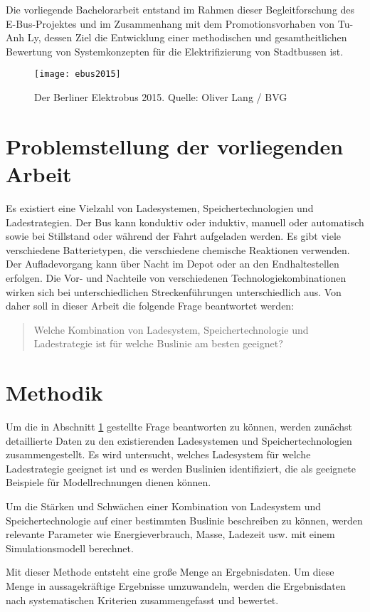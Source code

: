 Die vorliegende Bachelorarbeit entstand im Rahmen dieser Begleitforschung des E-Bus-Projektes und im Zusammenhang mit dem Promotionsvorhaben von Tu-Anh Ly, dessen Ziel die Entwicklung einer methodischen und gesamtheitlichen Bewertung von Systemkonzepten für die Elektrifizierung von Stadtbussen ist.   

\begin{figure}\centering
	\texttt{[image: ebus2015]}
	\caption[Der Berliner Elektrobus 2015]{Der Berliner Elektrobus 2015. Quelle: Oliver Lang / BVG}
	\label{abb_ebus2015}
\end{figure}

\section{Problemstellung der vorliegenden Arbeit}
\label{abs_problem}
Es existiert eine Vielzahl von Ladesystemen, Speichertechnologien und Ladestrategien. Der Bus kann konduktiv oder induktiv, manuell oder automatisch sowie bei Stillstand oder während der Fahrt aufgeladen werden. Es gibt viele verschiedene Batterietypen, die verschiedene chemische Reaktionen verwenden. Der Aufladevorgang kann über Nacht im Depot oder an den Endhaltestellen erfolgen. Die Vor- und Nachteile von verschiedenen Technologiekombinationen wirken sich bei unterschiedlichen Streckenführungen unterschiedlich aus. Von daher soll in dieser Arbeit die folgende Frage beantwortet werden:
\begin{quote}
	Welche Kombination von Ladesystem, Speichertechnologie und Ladestrategie ist für welche Buslinie am besten geeignet?
\end{quote}

\section{Methodik}
Um die in Abschnitt \ref{abs_problem} gestellte Frage beantworten zu können, werden zunächst detaillierte Daten zu den existierenden Ladesystemen und Speichertechnologien zusammengestellt. Es wird untersucht, welches Ladesystem für welche Ladestrategie geeignet ist und es werden Buslinien identifiziert, die als geeignete Beispiele für Modellrechnungen dienen können.

Um die Stärken und Schwächen einer Kombination von Ladesystem und Speichertechnologie auf einer bestimmten Buslinie beschreiben zu können, werden relevante Parameter wie Energieverbrauch, Masse, Ladezeit usw. mit einem Simulationsmodell berechnet.

Mit dieser Methode entsteht eine große Menge an Ergebnisdaten. Um diese Menge in aussagekräftige Ergebnisse umzuwandeln, werden die Ergebnisdaten nach systematischen Kriterien zusammengefasst und bewertet.